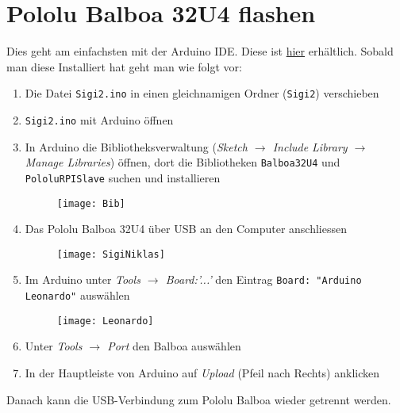 \documentclass[a4paper]{article}
\begin{document}
\section*{Pololu Balboa 32U4 flashen}
Dies geht am einfachsten mit der Arduino IDE. Diese ist \hyperref{https://www.arduino.cc/en/Main/Software}{}{}{hier} erhältlich. Sobald man diese Installiert hat geht man wie folgt vor:
\begin{enumerate}
	\item Die Datei \verb|Sigi2.ino| in einen gleichnamigen Ordner (\verb|Sigi2|) verschieben
	\item \verb|Sigi2.ino| mit Arduino öffnen
	\item In Arduino die Bibliotheksverwaltung (\textit{Sketch $\rightarrow$ Include Library $\rightarrow$ Manage Libraries}) öffnen, dort die Bibliotheken \verb|Balboa32U4| und \verb|PololuRPISlave| suchen und installieren
	
	\begin{figure}[H]
		\centering
		\texttt{[image: Bib]}
		\caption[Bibliotheken]\label{Bibliotheken}
	\end{figure}

	\item Das Pololu Balboa 32U4 über USB an den Computer anschliessen
		\begin{figure}[H]
		\centering
		\texttt{[image: SigiNiklas]}
		\caption[Sigi]\label{Sigi anschliessen}
		\end{figure}
	\item Im Arduino unter \textit{Tools $\rightarrow$ Board:'...'} den Eintrag \verb|Board: "Arduino Leonardo"| auswählen
	
	\begin{figure}[H]
		\centering
		\texttt{[image: Leonardo]}
		\caption[Board]\label{Board auswählen}
	\end{figure}

	\item Unter \textit{Tools $\rightarrow$ Port} den Balboa auswählen
	\item In der Hauptleiste von Arduino auf \textit{Upload} (Pfeil nach Rechts) anklicken
\end{enumerate}
Danach kann die USB-Verbindung zum Pololu Balboa wieder getrennt werden.\\
\end{document}

